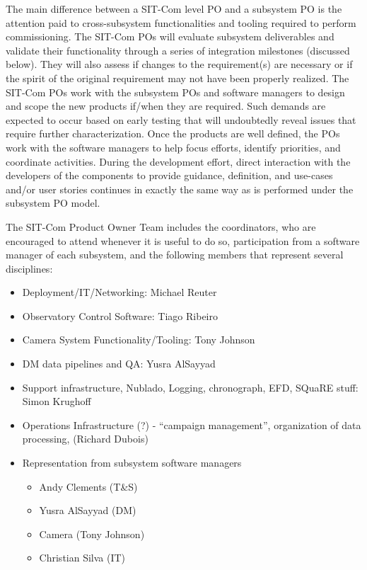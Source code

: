 \documentclass[SE,toc]{lsstdoc}
\begin{document}
The main difference between a SIT-Com level PO and a subsystem PO is the attention paid to cross-subsystem functionalities and tooling required to perform commissioning.
The SIT-Com POs will evaluate subsystem deliverables and validate their functionality through a series of integration milestones (discussed below).
They will also assess if changes to the requirement(s) are necessary or if the spirit of the original requirement may not have been properly realized.
The SIT-Com POs work with the subsystem POs and software managers to design and scope the new products if/when they are required.
Such demands are expected to occur based on early testing that will undoubtedly reveal issues that require further characterization.
Once the products are well defined, the POs work with the software managers to help focus efforts, identify priorities, and coordinate activities.
During the development effort, direct interaction with the developers of the components to provide guidance, definition, and use-cases and/or user stories continues in exactly the same way as is performed under the subsystem PO model.

The SIT-Com Product Owner Team includes the coordinators, who are encouraged to attend whenever it is useful to do so, participation from a software manager of each subsystem, and the following members that represent several disciplines:

\begin{itemize}
    \item Deployment/IT/Networking: Michael Reuter
    \item Observatory Control Software: Tiago Ribeiro
    \item Camera System Functionality/Tooling: Tony Johnson
    \item DM data pipelines and QA: Yusra AlSayyad
    \item Support infrastructure, Nublado, Logging, chronograph, EFD, SQuaRE stuff: Simon Krughoff
    \item Operations Infrastructure (?) -  “campaign management”, organization of data processing,  (Richard Dubois)
    \item Representation from subsystem software managers
    \begin{itemize}
        \item Andy Clements (T\&S)
        \item Yusra AlSayyad (DM)
        \item Camera (Tony Johnson)
        \item Christian Silva (IT)
    \end{itemize}

\end{itemize}
\end{document}
